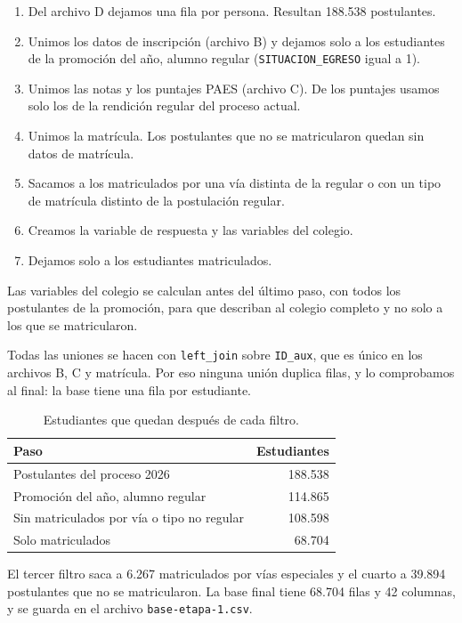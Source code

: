 \documentclass[11pt,letterpaper]{article}
\begin{document}
\begin{enumerate}
\item Del archivo D dejamos una fila por persona. Resultan 188.538 postulantes.
\item Unimos los datos de inscripción (archivo B) y dejamos solo a los estudiantes de la promoción del año, alumno regular (\texttt{SITUACION\_EGRESO} igual a 1).
\item Unimos las notas y los puntajes PAES (archivo C). De los puntajes usamos solo los de la rendición regular del proceso actual.
\item Unimos la matrícula. Los postulantes que no se matricularon quedan sin datos de matrícula.
\item Sacamos a los matriculados por una vía distinta de la regular o con un tipo de matrícula distinto de la postulación regular.
\item Creamos la variable de respuesta y las variables del colegio.
\item Dejamos solo a los estudiantes matriculados.
\end{enumerate}

Las variables del colegio se calculan antes del último paso, con todos los postulantes de la promoción, para que describan al colegio completo y no solo a los que se matricularon.

Todas las uniones se hacen con \texttt{left\_join} sobre \texttt{ID\_aux}, que es único en los archivos B, C y matrícula. Por eso ninguna unión duplica filas, y lo comprobamos al final: la base tiene una fila por estudiante.

\begin{table}[h]
\centering
\begin{tabular}{lr}
\toprule
Paso & Estudiantes \\
\midrule
Postulantes del proceso 2026 & 188.538 \\
Promoción del año, alumno regular & 114.865 \\
Sin matriculados por vía o tipo no regular & 108.598 \\
Solo matriculados & 68.704 \\
\bottomrule
\end{tabular}
\caption{Estudiantes que quedan después de cada filtro.}
\end{table}

El tercer filtro saca a 6.267 matriculados por vías especiales y el cuarto a 39.894 postulantes que no se matricularon. La base final tiene 68.704 filas y 42 columnas, y se guarda en el archivo \texttt{base-etapa-1.csv}.
\end{document}
